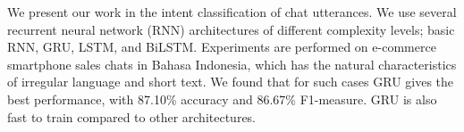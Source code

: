 We present our work in the intent classification of chat utterances. We use several recurrent neural network (RNN) architectures of different complexity levels; basic RNN, GRU, LSTM, and BiLSTM. Experiments are performed on e-commerce smartphone sales chats in Bahasa Indonesia, which has the natural characteristics of irregular language and short text. We found that for such cases GRU gives the best performance, with 87.10\% accuracy and 86.67\% F1-measure. GRU is also fast to train compared to other architectures.
